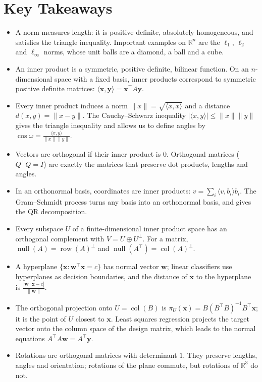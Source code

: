 \documentclass[11pt]{article}
\newcommand{\norm}[1]{\lVert #1 \rVert}
\newcommand{\ip}[2]{\langle #1, #2 \rangle}
\theoremstyle{definition}
\theoremstyle{plain}
\theoremstyle{remark}
\DeclareMathOperator{\Null}{null}
\DeclareMathOperator{\col}{col}
\DeclareMathOperator{\row}{row}
\begin{document}
\section{Key Takeaways}
\begin{itemize}[leftmargin=*]
    \item A norm measures length: it is positive definite, absolutely homogeneous, and satisfies the triangle inequality. Important examples on $\mathbb{R}^n$ are the $\ell_1$, $\ell_2$ and $\ell_\infty$ norms, whose unit balls are a diamond, a ball and a cube.
    \item An inner product is a symmetric, positive definite, bilinear function. On an $n$-dimensional space with a fixed basis, inner products correspond to symmetric positive definite matrices: $\ip{\mathbf{x}}{\mathbf{y}} = \mathbf{x}^\top A \mathbf{y}$.
    \item Every inner product induces a norm $\norm{x} = \sqrt{\ip{x}{x}}$ and a distance $d(x, y) = \norm{x - y}$. The Cauchy--Schwarz inequality $|\ip{x}{y}| \leq \norm{x}\norm{y}$ gives the triangle inequality and allows us to define angles by $\cos\omega = \frac{\ip{x}{y}}{\norm{x}\norm{y}}$.
    \item Vectors are orthogonal if their inner product is $0$. Orthogonal matrices ($Q^\top Q = I$) are exactly the matrices that preserve dot products, lengths and angles.
    \item In an orthonormal basis, coordinates are inner products: $v = \sum_i \ip{v}{b_i} b_i$. The Gram--Schmidt process turns any basis into an orthonormal basis, and gives the QR decomposition.
    \item Every subspace $U$ of a finite-dimensional inner product space has an orthogonal complement with $V = U \oplus U^\perp$. For a matrix, $\Null(A) = \row(A)^\perp$ and $\Null(A^\top) = \col(A)^\perp$.
    \item A hyperplane $\{\mathbf{x} : \mathbf{w}^\top \mathbf{x} = c\}$ has normal vector $\mathbf{w}$; linear classifiers use hyperplanes as decision boundaries, and the distance of $\mathbf{x}$ to the hyperplane is $\frac{|\mathbf{w}^\top \mathbf{x} - c|}{\norm{\mathbf{w}}}$.
    \item The orthogonal projection onto $U = \col(B)$ is $\pi_U(\mathbf{x}) = B(B^\top B)^{-1}B^\top \mathbf{x}$; it is the point of $U$ closest to $\mathbf{x}$. Least squares regression projects the target vector onto the column space of the design matrix, which leads to the normal equations $A^\top A \mathbf{w} = A^\top \mathbf{y}$.
    \item Rotations are orthogonal matrices with determinant $1$. They preserve lengths, angles and orientation; rotations of the plane commute, but rotations of $\mathbb{R}^3$ do not.

\end{itemize}
\end{document}
